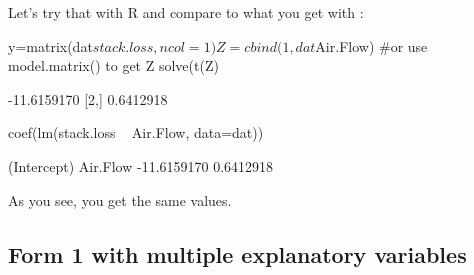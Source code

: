 Let's try that with R and compare to what you get with \verb@lm@:
\begin{Schunk}
\begin{Sinput}
 y=matrix(dat$stack.loss, ncol=1)
 Z=cbind(1,dat$Air.Flow) #or use model.matrix() to get Z
 solve(t(Z)%*%Z)%*%t(Z)%*%y
\end{Sinput}
\begin{Soutput}
            [,1]
[1,] -11.6159170
[2,]   0.6412918
\end{Soutput}
\begin{Sinput}
 coef(lm(stack.loss ~ Air.Flow, data=dat))
\end{Sinput}
\begin{Soutput}
(Intercept)    Air.Flow 
-11.6159170   0.6412918 
\end{Soutput}
\end{Schunk}
As you see, you get the same values.

\subsection{Form 1 with multiple explanatory variables}

